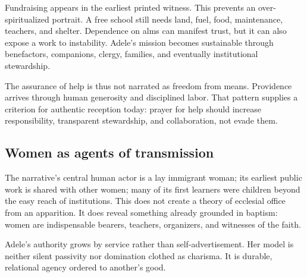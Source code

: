 Fundraising appears in the earliest printed witness. This prevents an over-spiritualized portrait. A free school still needs land, fuel, food, maintenance, teachers, and shelter. Dependence on alms can manifest trust, but it can also expose a work to instability. Adele's mission becomes sustainable through benefactors, companions, clergy, families, and eventually institutional stewardship.

The assurance of help is thus not narrated as freedom from means. Providence arrives through human generosity and disciplined labor. That pattern supplies a criterion for authentic reception today: prayer for help should increase responsibility, transparent stewardship, and collaboration, not evade them.

\subsection{Women as agents of transmission}

The narrative's central human actor is a lay immigrant woman; its earliest public work is shared with other women; many of its first learners were children beyond the easy reach of institutions. This does not create a theory of ecclesial office from an apparition. It does reveal something already grounded in baptism: women are indispensable bearers, teachers, organizers, and witnesses of the faith.

Adele's authority grows by service rather than self-advertisement. Her model is neither silent passivity nor domination clothed as charisma. It is durable, relational agency ordered to another's good.

